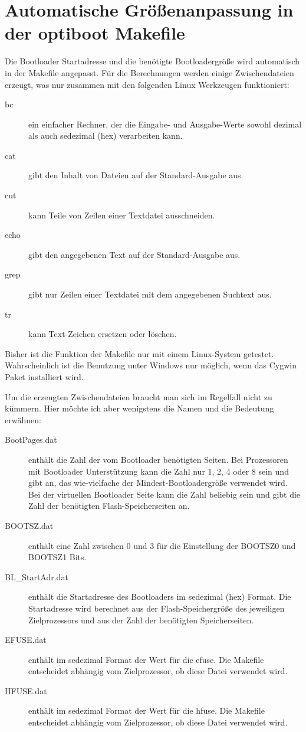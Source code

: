 \section{Automatische Größenanpassung in der optiboot Makefile}

Die Bootloader Startadresse und die benötigte Bootloadergröße wird
automatisch in der Makefile angepasst. Für die Berechnungen werden
einige Zwischendateien erzeugt, was nur zusammen
mit den folgenden Linux Werkzeugen funktioniert:
\begin{description}
\item [bc] ein einfacher Rechner, der die Eingabe- und Ausgabe-Werte
sowohl dezimal als auch sedezimal (hex) verarbeiten kann.
\item [cat] gibt den Inhalt von Dateien auf der Standard-Ausgabe aus.
\item [cut] kann Teile von Zeilen einer Textdatei ausschneiden.
\item [echo] gibt den angegebenen Text auf der Standard-Ausgabe aus.
\item [grep] gibt nur Zeilen einer Textdatei mit dem angegebenen Suchtext aus.
\item [tr] kann Text-Zeichen ersetzen oder löschen.
\end{description}

Bisher ist die Funktion der Makefile nur mit einem Linux-System getestet.
Wahrscheinlich ist die Benutzung unter Windows nur möglich,
wenn das Cygwin Paket installiert wird.

Um die erzeugten Zwischendateien braucht man sich im Regelfall nicht zu kümmern. Hier
möchte ich aber wenigstens die Namen und die Bedeutung erwähnen:
\begin{description}
\item [BootPages.dat] enthält die Zahl der vom Bootloader benötigten Seiten.
Bei Prozessoren mit Bootloader Unterstützung kann die Zahl nur 1, 2, 4 oder 8 sein und
gibt an, das wie-vielfache der Mindest-Bootloadergröße verwendet wird.
Bei der virtuellen Bootloader Seite kann die Zahl beliebig sein und gibt die Zahl der
benötigten Flash-Speicherseiten an.
\item [BOOTSZ.dat] enthält eine Zahl zwischen 0 und 3 für die Einstellung der BOOTSZ0 und BOOTSZ1 Bits.
\item [BL\_StartAdr.dat] enthält die Startadresse des Bootloaders im sedezimal (hex) Format.
Die Startadresse wird berechnet aus der Flash-Speichergröße des jeweiligen Zielprozessors und
aus der Zahl der benötigten Speicherseiten.
\item [EFUSE.dat] enthält im sedezimal Format der Wert für die efuse. Die Makefile entscheidet
 abhängig vom Zielprozessor, ob diese Datei verwendet wird.
\item [HFUSE.dat] enthält im sedezimal Format der Wert für die hfuse. Die Makefile entscheidet
 abhängig vom Zielprozessor, ob diese Datei verwendet wird.
\end{description}

